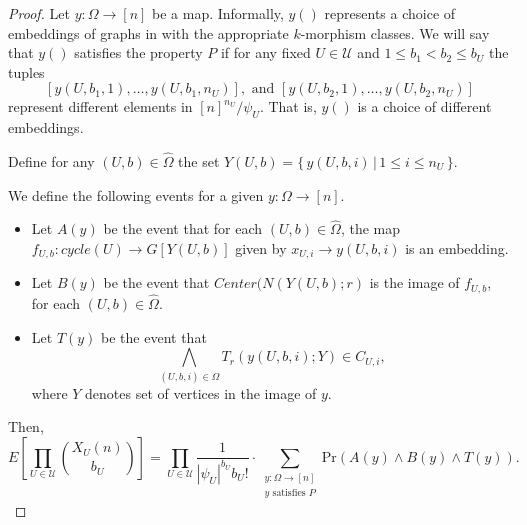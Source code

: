 \documentclass[11pt,notitlepage,a4paper]{article}
\theoremstyle{definition}
\begin{document}
\begin{proof}
	Let $y: \Omega \rightarrow [n]$ be a map. Informally, $y()$
	represents a choice of embeddings of graphs in with the appropriate
	$k$-morphism classes. We will say that $y()$ satisfies the property
	$P$ if for any fixed $U\in \mathcal{U}$ and $1\leq b_1<b_2\leq b_{U}$
	the tuples
	\[ [y(U,b_1,1), \dots, y(U,b_1,n_U)], \text{ and }
	[y(U,b_2,1), \dots, y(U,b_2,n_U)] \]
	represent different elements in $[n]^{n_U}/\psi_U$. That is, $y()$ is 
	a choice of different embeddings.\par
	Define for any $(U,b)\in \widehat{\Omega}$
	the set $Y(U,b)=\{ \, y(U,b,i) \, | \, 1\leq i \leq n_U \, \}$.
	
	We define the following events for a given $y:\Omega\rightarrow [n]$.
	\begin{itemize}
		\item Let $A(y)$ be the event that for each $(U,b)\in \widehat{\Omega}$,
		the map $f_{U,b}:cycle(U)\rightarrow G[Y(U,b)]$ given
		by $x_{U,i} \rightarrow y(U,b,i)$ is an embedding. 	
		\item Let $B(y)$ be the event that $Center(N(Y(U,b);r)$ is 
		the image of $f_{U,b}$,	for each $(U,b)\in \widehat{\Omega}$.
		\item Let $T(y)$ be the event that 
		\[\bigwedge_{(U,b,i)\in \Omega} T_r(y(U,b,i); Y)\in C_{U,i}, \]
		where $Y$ denotes set of vertices in the image of $y$.  
	\end{itemize}
	Then,
	\[ E\left[\prod_{U\in \mathcal{U}}
	\binom{X_{U}(n)}{b_{U}}\right] = \prod_{U\in \mathcal{U}} 
	\frac{1}{|\psi_U|^{b_U}b_U!} \cdot
	\sum_{\substack{y:\Omega \rightarrow [n]\\y \text{ satisfies }P}}
	\mathrm{Pr}(A(y)\wedge B(y)\wedge T(y)). \]
	

\end{proof}
\end{document}
